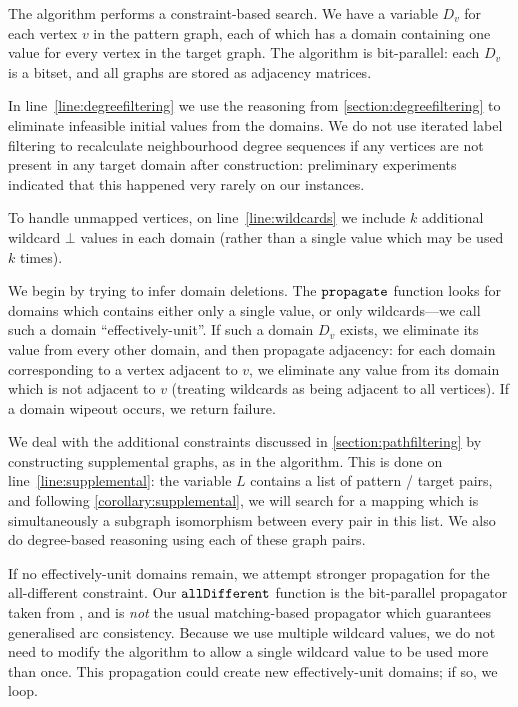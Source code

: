 \documentclass[letterpaper]{article}
\newcommand{\citet}[1]{\citeauthor{#1} \shortcite{#1}}
\newcommand{\citep}[1]{\cite{#1}}
\theoremstyle{definition}
\begin{document}
The algorithm performs a constraint-based search. We have a variable $D_v$ for each vertex $v$ in
the pattern graph, each of which has a domain containing one value for every vertex in the target
graph. The algorithm is bit-parallel: each $D_v$ is a bitset, and all graphs are stored as adjacency
matrices.

In line~\ref{line:degreefiltering} we use the reasoning from \cref{section:degreefiltering} to
eliminate infeasible initial values from the domains. We do not use iterated label filtering
\citep{constraints10} to recalculate neighbourhood degree sequences if any vertices are not present
in any target domain after construction: preliminary experiments indicated that this happened very
rarely on our instances.

To handle unmapped vertices, on line~\ref{line:wildcards} we include $k$ additional wildcard $\bot$
values in each domain (rather than a single value which may be used $k$ times).

We begin by trying to infer domain deletions. The $\FuncSty{propagate}$ function looks for domains
which contains either only a single value, or only wildcards---we call such a domain
``effectively-unit''. If such a domain $D_v$ exists, we eliminate its value from every other domain,
and then propagate adjacency: for each domain corresponding to a vertex adjacent to $v$, we
eliminate any value from its domain which is not adjacent to $v$ (treating wildcards as being
adjacent to all vertices). If a domain wipeout occurs, we return failure.

We deal with the additional constraints discussed in \cref{section:pathfiltering} by constructing
supplemental graphs, as in the \citet{DBLP:conf/cp/McCreeshP15} algorithm. This is done on
line~\ref{line:supplemental}: the variable $L$ contains a list of pattern / target pairs, and
following \cref{corollary:supplemental}, we will search for a mapping which is simultaneously a
subgraph isomorphism between every pair in this list. We also do degree-based reasoning using each
of these graph pairs.

If no effectively-unit domains remain, we attempt stronger propagation for the all-different
constraint. Our $\FuncSty{allDifferent}$ function is the bit-parallel propagator taken from
\citet{DBLP:conf/cp/McCreeshP15}, and is \emph{not} the usual matching-based propagator
\citep{DBLP:conf/aaai/Regin94} which guarantees generalised arc consistency. Because we use multiple
wildcard values, we do not need to modify the algorithm to allow a single wildcard value to be used
more than once. This propagation could create new effectively-unit domains; if so, we loop.
\end{document}
